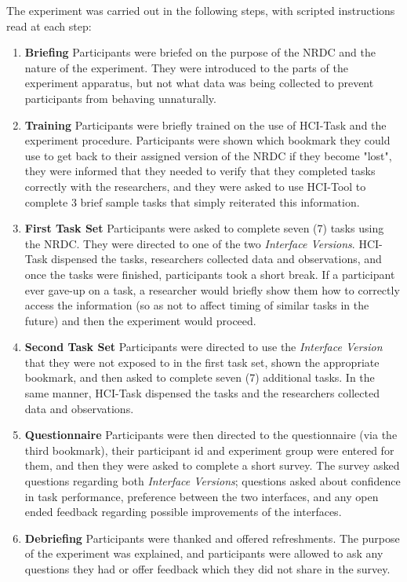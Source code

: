 \documentclass{acm_proc_article-sp}
\begin{document}
The experiment was carried out in the following steps, with scripted instructions read at each step:
\begin{enumerate}
\item \textbf{Briefing}
Participants were briefed on the purpose of the NRDC and the nature of the experiment. They were introduced to the parts of the experiment apparatus, but not what data was being collected to prevent participants from behaving unnaturally.

\item \textbf{Training}
Participants were briefly trained on the use of HCI-Task and the experiment procedure. Participants were shown which bookmark they could use to get back to their assigned version of the NRDC if they become "lost", they were informed that they needed to verify that they completed tasks correctly with the researchers, and they were asked to use HCI-Tool to complete 3 brief sample tasks that simply reiterated this information.

\item \textbf{First Task Set}
Participants were asked to complete seven (7) tasks using the NRDC. They were directed to one of the two \emph{Interface Versions}. HCI-Task dispensed the tasks, researchers collected data and observations, and once the tasks were finished, participants took a short break. If a participant ever gave-up on a task, a researcher would briefly show them how to correctly access the information (so as not to affect timing of similar tasks in the future) and then the experiment would proceed.

\item \textbf{Second Task Set}
Participants were directed to use the \emph{Interface Version} that they were not exposed to in the first task set, shown the appropriate bookmark, and then asked to complete seven (7) additional tasks. In the same manner, HCI-Task dispensed the tasks and the researchers collected data and observations.

\item \textbf{Questionnaire}
Participants were then directed to the questionnaire (via the third bookmark), their participant id and experiment group were entered for them, and then they were asked to complete a short survey. The survey asked questions regarding both \emph{Interface Versions}; questions asked about confidence in task performance, preference between the two interfaces, and any open ended feedback regarding possible improvements of the interfaces.

\item \textbf{Debriefing}
Participants were thanked and offered refreshments. The purpose of the experiment was explained, and participants were allowed to ask any questions they had or offer feedback which they did not share in the survey.
%
\end{enumerate}
\end{document}
